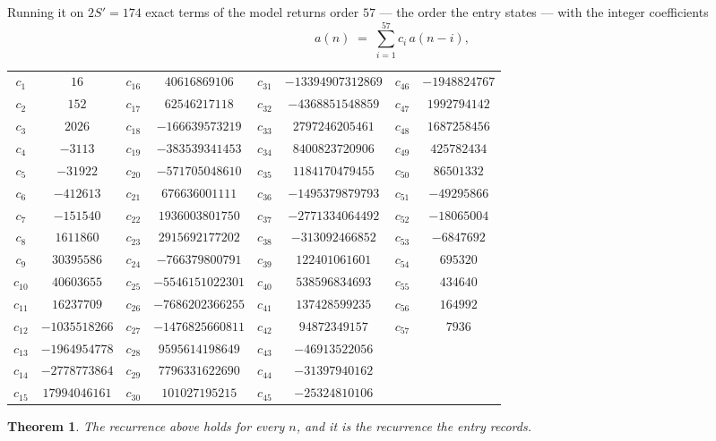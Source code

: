 \documentclass[11pt,a4paper]{article}
\theoremstyle{plain}
\newtheorem{theorem}{Theorem}
\theoremstyle{definition}
\begin{document}
Running it on $2S'=174$ exact terms of the model returns order $57$ --- the order the
entry states --- with the integer coefficients
\[
a(n)\;=\;\sum_{i=1}^{57}c_i\,a(n-i),
\]
\begin{center}\small
\begin{tabular}{cccccccc}
$c_{1}$ & $16$ & $c_{16}$ & $40616869106$ & $c_{31}$ & $-13394907312869$ & $c_{46}$ & $-1948824767$ \\
$c_{2}$ & $152$ & $c_{17}$ & $62546217118$ & $c_{32}$ & $-4368851548859$ & $c_{47}$ & $1992794142$ \\
$c_{3}$ & $2026$ & $c_{18}$ & $-166639573219$ & $c_{33}$ & $2797246205461$ & $c_{48}$ & $1687258456$ \\
$c_{4}$ & $-3113$ & $c_{19}$ & $-383539341453$ & $c_{34}$ & $8400823720906$ & $c_{49}$ & $425782434$ \\
$c_{5}$ & $-31922$ & $c_{20}$ & $-571705048610$ & $c_{35}$ & $1184170479455$ & $c_{50}$ & $86501332$ \\
$c_{6}$ & $-412613$ & $c_{21}$ & $676636001111$ & $c_{36}$ & $-1495379879793$ & $c_{51}$ & $-49295866$ \\
$c_{7}$ & $-151540$ & $c_{22}$ & $1936003801750$ & $c_{37}$ & $-2771334064492$ & $c_{52}$ & $-18065004$ \\
$c_{8}$ & $1611860$ & $c_{23}$ & $2915692177202$ & $c_{38}$ & $-313092466852$ & $c_{53}$ & $-6847692$ \\
$c_{9}$ & $30395586$ & $c_{24}$ & $-766379800791$ & $c_{39}$ & $122401061601$ & $c_{54}$ & $695320$ \\
$c_{10}$ & $40603655$ & $c_{25}$ & $-5546151022301$ & $c_{40}$ & $538596834693$ & $c_{55}$ & $434640$ \\
$c_{11}$ & $16237709$ & $c_{26}$ & $-7686202366255$ & $c_{41}$ & $137428599235$ & $c_{56}$ & $164992$ \\
$c_{12}$ & $-1035518266$ & $c_{27}$ & $-1476825660811$ & $c_{42}$ & $94872349157$ & $c_{57}$ & $7936$ \\
$c_{13}$ & $-1964954778$ & $c_{28}$ & $9595614198649$ & $c_{43}$ & $-46913522056$ &  &  \\
$c_{14}$ & $-2778773864$ & $c_{29}$ & $7796331622690$ & $c_{44}$ & $-31397940162$ &  &  \\
$c_{15}$ & $17994046161$ & $c_{30}$ & $101027195215$ & $c_{45}$ & $-25324810106$ &  &  \\
\end{tabular}
\end{center}

\begin{theorem}
The recurrence above holds for every $n$, and it is the recurrence the entry records.
\end{theorem}
\end{document}
